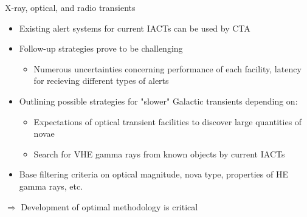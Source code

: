 \begin{frame}{X-ray, optical, and radio transients}
\begin{itemize}
  \item Existing alert systems for current IACTs can be used by CTA
  \item Follow-up strategies prove to be challenging
  \begin{itemize}
    \item [\to] Numerous uncertainties concerning performance of each facility, latency for recieving different types of alerts
  \end{itemize}
  \item Outlining possible strategies for "slower" Galactic transients depending on:
  \begin{itemize}
    \item [\to] Expectations of optical transient facilities to discover large quantities of novae
    \item [\to] Search for VHE gamma rays from known objects by current IACTs
  \end{itemize}
  \item Base filtering criteria on optical magnitude, nova type, properties of HE gamma rays, etc.
\end{itemize}
\begin{center}
  \textcolor{tugreen}{$\Longrightarrow$} Development of optimal methodology is critical
\end{center}

\end{frame}

